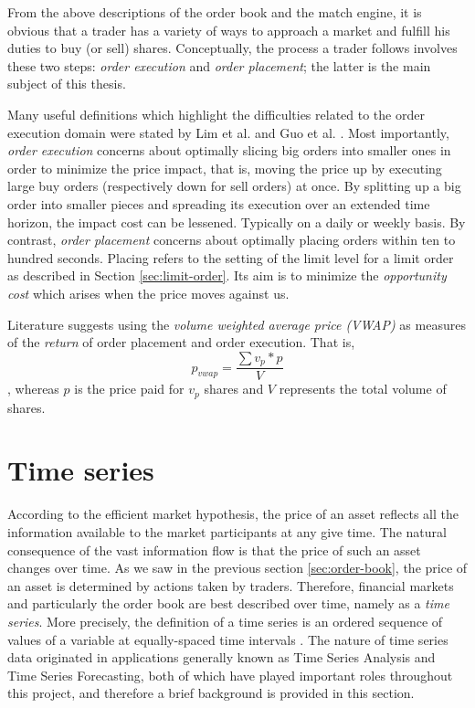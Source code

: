 From the above descriptions of the order book and the match engine, it is obvious that a trader has a variety of ways to approach a market and fulfill his duties to buy (or sell) shares.
Conceptually, the process a trader follows involves these two steps: \textit{order execution} and \textit{order placement}; the latter is the main subject of this thesis.

Many useful definitions which highlight the difficulties related to the order execution domain were stated by Lim et al. \cite{lim2005optimal} and Guo et al. \cite{guo2013optimal}.
Most importantly, \textit{order execution} concerns about optimally slicing big orders into smaller ones in order to minimize the price impact, that is, moving the price up by executing large buy orders (respectively down for sell orders) at once. 
By splitting up a big order into smaller pieces and spreading its execution over an extended time horizon, the impact cost can be lessened.
Typically on a daily or weekly basis.
By contrast, \textit{order placement} concerns about optimally placing orders within ten to hundred seconds.
Placing refers to the setting of the limit level for a limit order as described in Section \ref{sec:limit-order}.
Its aim is to minimize the \textit{opportunity cost} which arises when the price moves against us.

Literature\cite{nevmyvaka2006reinforcement, guo2013optimal} suggests using the \textit{volume weighted average price (VWAP)} as measures of the \textit{return} of order placement and order execution.
That is,
\begin{equation}\label{eq:vwap}
    p_{vwap}=\frac{\sum{v_p*p}}{V}
\end{equation}
, whereas $p$ is the price paid for $v_p$ shares and $V$ represents the total volume of shares.

\section{Time series}

According to the efficient market hypothesis\cite{malkiel1989efficient}, the price of an asset reflects all the information available to the market participants at any give time. 
The natural consequence of the vast information flow is that the price of such an asset changes over time.
As we saw in the previous section \ref{sec:order-book}, the price of an asset is determined by actions taken by traders.
Therefore, financial markets and particularly the order book are best described over time, namely as a \textit{time series}. 
More precisely, the definition of a time series is an ordered sequence of values of a variable at equally-spaced time intervals \cite{intro-timeseries}.
The nature of time series data originated in applications generally known as Time Series Analysis and Time Series Forecasting, both of which have played important roles throughout this project, and therefore a brief background is provided in this section.

